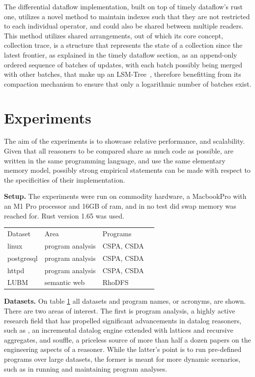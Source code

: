 \documentclass[manuscript,screen,review]{acmart}
\theoremstyle{definition}
\begin{document}
The differential dataflow implementation, built on top of timely dataflow's rust one, utilizes a novel method to maintain indexes such that they are not restricted
to each individual operator, and could also be shared between multiple readers. This method utilizes shared arrangements, out of which its core concept, collection
trace, is a structure that represents the state of a collection since the latest frontier, as explained in the timely dataflow section, as an append-only ordered sequence
of batches of updates, with each batch possibly being merged with other batches, that make up an LSM-Tree~\cite{lsm}, therefore benefitting from its compaction mechanism
to ensure that only a logarithmic number of batches exist.

\section{Experiments}

The aim of the experiments is to showcase relative performance, and scalability. Given that all reasoners to be compared share as much code as possible, are written in the same
programming language, and use the same elementary memory model, possibly strong empirical statements can be made with respect to the specificities of their implementation.

\textbf{Setup.} The experiments were run on commodity hardware, a MacbookPro with an M1 Pro processor and 16GB of ram, and in no test did swap memory was reached for.
Rust version 1.65 was used.

\begin{table}[]
	\begin{tabular}{llll}
		Dataset    & Area             & Programs   \\
		linux      & program analysis & CSPA, CSDA \\
		postgresql & program analysis & CSPA, CSDA \\
		httpd      & program analysis & CSPA, CSDA \\
		LUBM       & semantic web     & RhoDFS
	\end{tabular}
	\label{table:datasets}
\end{table}

\textbf{Datasets.} On table \ref{table:datasets} all datasets and program names, or acronyms, are shown. There are two areas of interest. The first is program analysis, a highly active research
field that has propelled significant advancements in datalog reasoners, such as \cite{incA}, an incremental datalog engine extended with lattices and recursive aggregates, and
souffle\cite{souffle}, a priceless source of more than half a dozen papers on the engineering aspects of a reasoner. While the latter's point is to run pre-defined programs over
large datasets, the former is meant for more dynamic scenarios, such as in running and maintaining program analyses.
\end{document}
